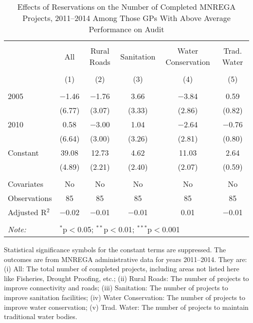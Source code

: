 \begin{table}[!htbp]
\centering
\begin{threeparttable}

  \caption{Effects of Reservations on the Number of Completed MNREGA Projects, 2011--2014 Among Those GPs With Above Average Performance on Audit} 
  \label{main_mnrega_audit} 
\scriptsize 
\begin{tabular}{@{\extracolsep{0pt}}lccccc} 
\\[-1.8ex]\hline 
\hline \\[-1.8ex] 
 & All & Rural Roads & Sanitation & Water Conservation & Trad. Water \\ 
\\[-1.8ex] & (1) & (2) & (3) & (4) & (5)\\ 
\hline \\[-1.8ex] 
 2005 & $-$1.46 & $-$1.76 & 3.66 & $-$3.84 & 0.59 \\ 
  & (6.77) & (3.07) & (3.33) & (2.86) & (0.82) \\ 
  2010 & 0.58 & $-$3.00 & 1.04 & $-$2.64 & $-$0.76 \\ 
  & (6.64) & (3.00) & (3.26) & (2.81) & (0.80) \\ 
  Constant & 39.08 & 12.73 & 4.62 & 11.03 & 2.64 \\ 
  & (4.89) & (2.21) & (2.40) & (2.07) & (0.59) \\ 
 \hline \\[-1.8ex] 
Covariates & No & No & No & No & No \\ 
Observations & 85 & 85 & 85 & 85 & 85 \\ 
Adjusted R$^{2}$ & $-$0.02 & $-$0.01 & $-$0.01 & 0.01 & $-$0.01 \\ 
\hline 
\hline \\[-1.8ex] 
\textit{Note:}  & \multicolumn{5}{l}{$^{*}$p$<$0.05; $^{**}$p$<$0.01; $^{***}$p$<$0.001} \\ 
\end{tabular} 
\begin{tablenotes}[flushleft]
\scriptsize
\item[] Statistical significance symbols for the constant terms are suppressed. The outcomes are from MNREGA administrative data for years 2011--2014. They are: 
(i) All: The total number of completed projects, including areas not listed here like Fisheries, Drought Proofing, etc.;
(ii) Rural Roads: The number of projects to improve connectivity and roads;
(iii) Sanitation: The number of projects to improve sanitation facilities;
(iv) Water Conservation: The number of projects to improve water conservation;
(v) Trad. Water: The number of projects to maintain traditional water bodies.
\end{tablenotes}
\end{threeparttable}
\end{table}
